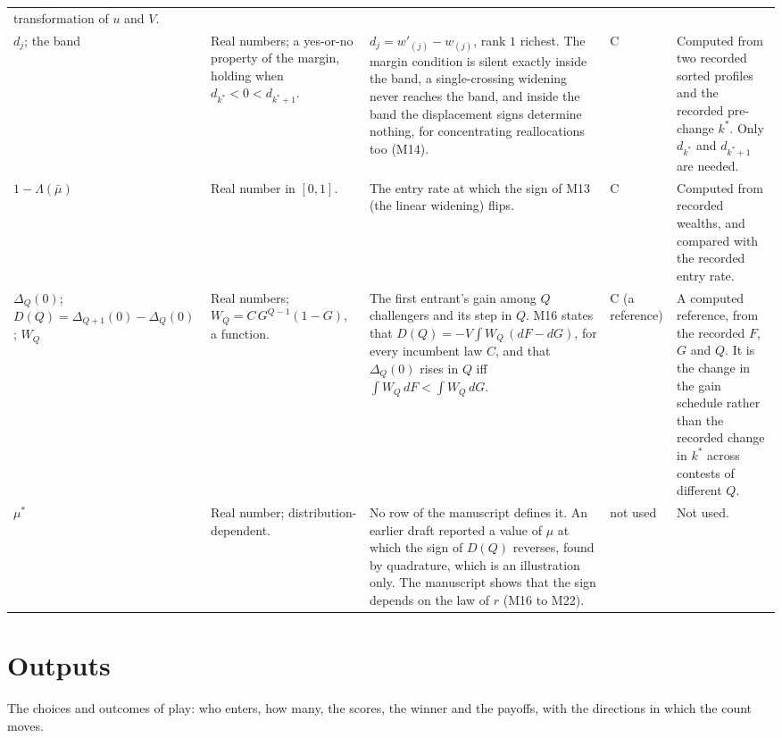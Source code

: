 \documentclass[11pt]{article}
\begin{document}
\begin{longtable}{@{}P{1.9cm}P{2.4cm}P{4.5cm}P{1.7cm}P{4.7cm}@{}}
  transformation of $u$ and $V$. \\ \addlinespace
$d_j$; the band & Real numbers; a yes-or-no property of the margin, holding
  when $d_{k^*}<0<d_{k^*+1}$. & $d_j=w'_{(j)}-w_{(j)}$, rank $1$ richest. The
  margin condition is silent exactly inside the band, a single-crossing
  widening never reaches the band, and inside the band the displacement signs
  determine nothing, for concentrating reallocations too (M14). & C & Computed from two
  recorded sorted profiles and the recorded pre-change $k^*$. Only $d_{k^*}$
  and $d_{k^*+1}$ are needed. \\ \addlinespace
$1-\Lambda(\bar\mu)$ & Real number in $[0,1]$. & The entry rate at which the
  sign of M13 (the linear widening) flips. & C & Computed from recorded wealths, and compared
  with the recorded entry rate. \\ \addlinespace
$\Delta_Q(0)$; $D(Q)=\Delta_{Q+1}(0)-\Delta_Q(0)$; $W_Q$ & Real numbers;
  $W_Q=C\,G^{Q-1}(1-G)$, a function. & The first entrant's gain among $Q$
  challengers and its step in $Q$. M16 states that
  $D(Q)=-V\!\int W_Q\,(dF-dG)$, for every incumbent law $C$, and that
  $\Delta_Q(0)$ rises in $Q$ iff $\int W_Q\,dF<\int W_Q\,dG$. & C (a reference) & A computed
  reference, from the recorded $F$, $G$ and $Q$. It is the change in the gain
  schedule rather than the recorded change in $k^*$ across contests of
  different $Q$. \\ \addlinespace
$\mu^*$ & Real number; distribution-dependent. & No row of the manuscript
  defines it. An earlier draft reported a value of $\mu$ at which the sign of
  $D(Q)$ reverses, found by quadrature, which is an illustration only. The
  manuscript shows that the sign depends on the law of $r$ (M16 to M22). & not used & Not used. \\
\end{longtable}
\normalsize

\section*{Outputs}

The choices and outcomes of play: who enters, how many, the scores, the winner and the payoffs,
with the directions in which the count moves.
\end{document}
